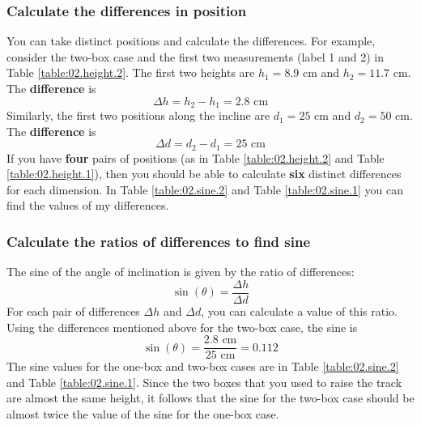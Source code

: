 \subsubsection{Calculate the differences in position}
You can take distinct positions and calculate the differences. For example, consider the two-box case and the first two measurements (label 1 and 2) in Table \ref{table:02.height.2}. The first two heights are $h_{1} = 8.9$ cm and $h_{2} = 11.7$ cm. The \textbf{difference} is
\begin{equation}
    \Delta h = h_{2} - h_{1} = 2.8 \text{ cm}
\end{equation}
Similarly, the first two positions along the incline are $d_{1} = 25$ cm and $d_{2} = 50$ cm. The \textbf{difference} is
\begin{equation}
    \Delta d = d_{2} - d_{1} = 25 \text{ cm}
\end{equation}
If you have \textbf{four} pairs of positions (as in Table \ref{table:02.height.2} and Table \ref{table:02.height.1}), then you should be able to calculate \textbf{six} distinct differences for each dimension. In Table \ref{table:02.sine.2} and Table \ref{table:02.sine.1} you can find the values of my differences.
\subsubsection{Calculate the ratios of differences to find sine}
The sine of the angle of inclination is given by the ratio of differences:
\begin{equation}
    \sin(\theta) = \frac{\Delta h}{\Delta d}
\end{equation}
For each pair of differences $\Delta h$ and $\Delta d$, you can calculate a value of this ratio. Using the differences mentioned above for the two-box case, the sine is
\begin{equation}
    \sin(\theta) = \frac{2.8 \text{ cm}}{25 \text{ cm}} = 0.112
\end{equation}
The sine values for the one-box and two-box cases are in Table \ref{table:02.sine.2} and Table \ref{table:02.sine.1}. Since the two boxes that you used to raise the track are almost the same height, it follows that the sine for the two-box case should be almost twice the value of the sine for the one-box case.
